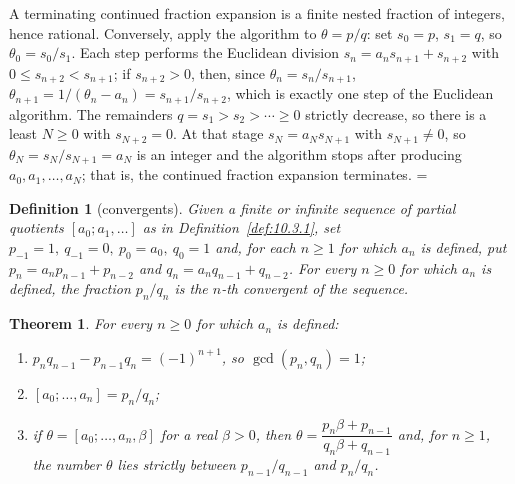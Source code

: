 \documentclass[11pt]{article}
\makeatletter
\theoremstyle{ntstyle}
\newtheorem{theorem}{Theorem}[subsection]
\newtheorem{definition}{Definition}[subsection]
\let\nt@closedisplay\]
\def\nt@guardedclose{\@ifnextchar\par{\nt@closeafterpar}{\@ifnextchar\end{\postdisplaypenalty\@M\nt@closedisplay}{\nt@closedisplay}}}
\def\nt@closeafterpar\par{\@ifnextchar\par{\nt@closeafterpar}{\@ifnextchar\end{\postdisplaypenalty\@M\nt@closedisplay\par}{\nt@closedisplay\par}}}
\renewenvironment{proof}[1][\proofname]{\par
  \pushQED{\qed}\normalfont\topsep\medskipamount\edef\nt@afterproof{\@endparpenalty=\the\@endparpenalty\relax}\@beginparpenalty\@M\@endparpenalty\@M\let\]\nt@guardedclose\trivlist\item[]\textit{#1\@addpunct{.}} \ignorespaces}{\ifvmode\addpenalty\@M\fi\popQED\nt@afterproof\endtrivlist\@endpefalse}
\makeatother
\begin{document}
\begin{proof} A terminating continued fraction expansion is a finite nested
	fraction of integers, hence rational. Conversely, apply the algorithm to
	$\theta=p/q$: set $s_0=p$, $s_1=q$, so $\theta_0=s_0/s_1$. Each step performs
	the Euclidean division $s_n=a_ns_{n+1}+s_{n+2}$ with
	$0\le s_{n+2}<s_{n+1}$; if $s_{n+2}>0$, then, since $\theta_n=s_n/s_{n+1}$,
	$\theta_{n+1}=1/(\theta_n-a_n)=s_{n+1}/s_{n+2}$, which is exactly one step of the Euclidean
	algorithm. The remainders $q=s_1>s_2>\cdots\ge0$ strictly decrease,
	so there is a least $N\ge0$ with $s_{N+2}=0$. At that stage
	$s_N=a_Ns_{N+1}$ with $s_{N+1}\neq0$, so
	$\theta_N=s_N/s_{N+1}=a_N$ is an integer and the algorithm stops after
	producing $a_0,a_1,\ldots,a_N$; that is, the continued fraction expansion
	terminates.
\end{proof}
\begin{definition}[convergents]\label{def:10.3.2} Given a finite or infinite sequence of partial quotients $[a_0;a_1,\ldots]$ as in Definition~\ref{def:10.3.1}, set
	$p_{-1}=1,\ q_{-1}=0,\ p_0=a_0,\ q_0=1$ and, for each $n\ge1$ for which $a_n$ is defined,
	put $p_n=a_np_{n-1}+p_{n-2}$ and $q_n=a_nq_{n-1}+q_{n-2}$. For every $n\ge0$ for which $a_n$ is defined, the fraction
	$p_n/q_n$ is the $n$-th convergent of the sequence.
\end{definition}
\begin{theorem}\label{thm:10.3.3} For every $n\ge0$ for which $a_n$ is defined:
	\begin{enumerate}[label={\alph*)}]
		\item $p_nq_{n-1}-p_{n-1}q_n=(-1)^{n+1}$, so
					$\gcd(p_n, q_n)=1$;
		\item $[a_0;\ldots,a_n]=p_n/q_n$;
		\item if $\theta=[a_0;\ldots,a_n,\beta]$ for a real $\beta>0$, then
					$\theta=\dfrac{p_n\beta+p_{n-1}}{q_n\beta+q_{n-1}}$ and, for
					$n\ge1$, the number $\theta$ lies strictly between
					$p_{n-1}/q_{n-1}$ and $p_n/q_n$.
	\end{enumerate}
\end{theorem}
\end{document}
